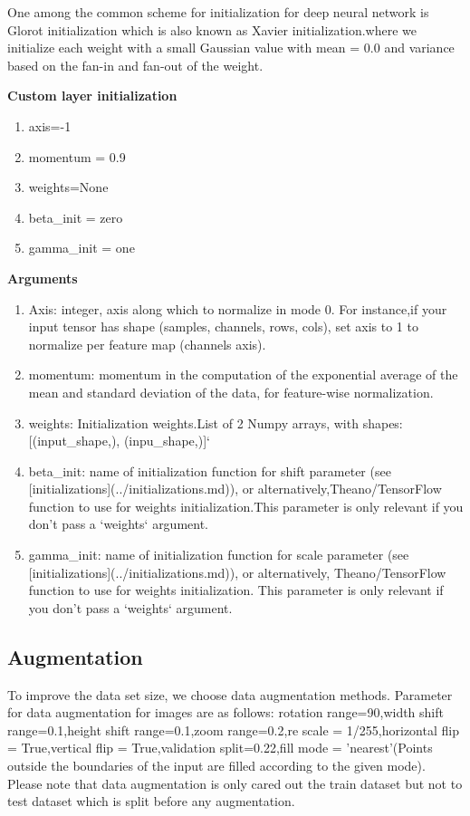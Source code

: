 \documentclass[a4paper,19pt]{article}
\begin{document}
\newline One among the common scheme for initialization for deep neural network is Glorot initialization which is also known as Xavier initialization.where we initialize each weight with a small Gaussian value with mean = 0.0 and variance based on the fan-in and fan-out of the weight.
\newline 

\textbf{Custom layer initialization}
\begin{enumerate}
    \item axis=-1
    \item momentum = 0.9
    \item weights=None
    \item beta\_init = zero
    \item gamma\_init = one
\end{enumerate}
\textbf{Arguments}
\begin{enumerate}
     \item Axis: integer, axis along which to normalize in mode 0. For instance,if your input tensor has shape (samples, channels, rows, cols), set axis to 1 to normalize per feature map (channels axis).
       \item momentum: momentum in the computation of the
            exponential average of the mean and standard deviation of the data, for feature-wise normalization.
        \item weights: Initialization weights.List of 2 Numpy arrays, with shapes:[(input\_shape,), (inpu\_shape,)]`
        \item beta\_init: name of initialization function for shift parameter (see [initializations](../initializations.md)), or alternatively,Theano/TensorFlow function to use for weights initialization.This parameter is only relevant if you don't pass a `weights` argument.
        \item gamma\_init: name of initialization function for scale parameter (see
            [initializations](../initializations.md)), or alternatively, Theano/TensorFlow function to use for weights initialization. This parameter is only relevant if you don't pass a `weights` argument.
\end{enumerate}

       


\subsection{Augmentation}
To improve the data set size, we choose data augmentation methods. Parameter for data augmentation for images are as follows:
\newline rotation range=90,width shift range=0.1,height shift range=0.1,zoom range=0.2,re scale = 1/255,horizontal flip = True,vertical flip = True,validation split=0.22,fill mode = 'nearest'(Points outside the boundaries of the input are filled according to the given mode). Please note that data augmentation is only cared out the train dataset but not to test dataset which is split before any augmentation.
\end{document}
